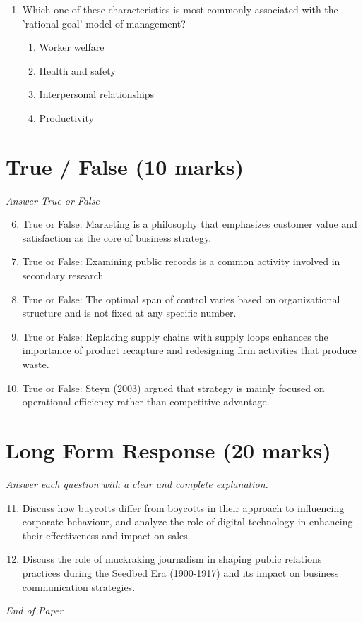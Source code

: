 \documentclass[12pt]{article}
\begin{document}
\begin{enumerate}[label=\arabic*.]
\begin{enumerate}[label=(\alph*)]
    \item Decoding.
    \item Transfer.
    \item Noise.
\end{enumerate}
\item Which one of these characteristics is most commonly associated with the 'rational goal' model of management?
\begin{enumerate}[label=(\alph*)]
    \item Worker welfare
    \item Health and safety
    \item Interpersonal relationships
    \item Productivity
\end{enumerate}
\end{enumerate}

\section*{True / False (10 marks)}
\textit{Answer True or False}
\begin{enumerate}[label=\arabic*.]
\setcounter{enumi}{5}
\item True or False: Marketing is a philosophy that emphasizes customer value and satisfaction as the core of business strategy.
\item True or False: Examining public records is a common activity involved in secondary research.
\item True or False: The optimal span of control varies based on organizational structure and is not fixed at any specific number.
\item True or False: Replacing supply chains with supply loops enhances the importance of product recapture and redesigning firm activities that produce waste.
\item True or False: Steyn (2003) argued that strategy is mainly focused on operational efficiency rather than competitive advantage.
\end{enumerate}

\section*{Long Form Response (20 marks)}
\textit{Answer each question with a clear and complete explanation.}
\begin{enumerate}[label=\arabic*.]
\setcounter{enumi}{10}
\item Discuss how buycotts differ from boycotts in their approach to influencing corporate behaviour, and analyze the role of digital technology in enhancing their effectiveness and impact on sales.
\item Discuss the role of muckraking journalism in shaping public relations practices during the Seedbed Era (1900-1917) and its impact on business communication strategies.
\end{enumerate}

\vfill
\noindent\textit{End of Paper}
\end{document}
